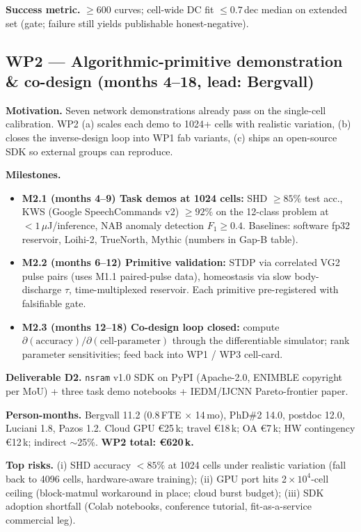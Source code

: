 \textbf{Success metric.} $\geq 600$ curves; cell-wide DC fit $\leq 0.7$\,dec
median on extended set (gate; failure still yields publishable
honest-negative).

\subsection{WP2 --- Algorithmic-primitive demonstration \& co-design
(months 4--18, lead: Bergvall)}

\textbf{Motivation.} Seven network demonstrations already pass on the
single-cell calibration. WP2 (a) scales each demo to 1024+ cells with
realistic variation, (b) closes the inverse-design loop into WP1 fab
variants, (c) ships an open-source SDK so external groups can reproduce.

\textbf{Milestones.}
\begin{itemize}[leftmargin=1.4em, topsep=2pt, itemsep=1pt]
\item \textbf{M2.1 (months 4--9) Task demos at 1024 cells:} SHD
$\geq\!85\%$ test acc., KWS (Google SpeechCommands v2)
$\geq\!92\%$ on the 12-class problem at $<\!1\,\mu$J/inference,
NAB anomaly detection $F_1\!\geq\!0.4$. Baselines: software fp32
reservoir, Loihi-2, TrueNorth, Mythic (numbers in Gap-B table).
\item \textbf{M2.2 (months 6--12) Primitive validation:} STDP via
correlated VG2 pulse pairs (uses M1.1 paired-pulse data), homeostasis
via slow body-discharge $\tau$, time-multiplexed reservoir. Each
primitive pre-registered with falsifiable gate.
\item \textbf{M2.3 (months 12--18) Co-design loop closed:} compute
$\partial(\text{accuracy})/\partial(\text{cell-parameter})$ through the
differentiable simulator; rank parameter sensitivities; feed back into
WP1 / WP3 cell-card.
\end{itemize}

\textbf{Deliverable D2.} \texttt{nsram} v1.0 SDK on PyPI
(Apache-2.0, ENIMBLE copyright per MoU) + three task demo notebooks +
IEDM/IJCNN Pareto-frontier paper.

\textbf{Person-months.} Bergvall 11.2 (0.8\,FTE $\times$ 14\,mo),
PhD\#2 14.0, postdoc 12.0, Luciani 1.8, Pazos 1.2. Cloud GPU
\euro 25\,k; travel \euro 18\,k; OA \euro 7\,k; HW contingency
\euro 12\,k; indirect $\sim$25\%.  \textbf{WP2 total: \euro 620\,k.}

\textbf{Top risks.} (i) SHD accuracy $<\!85\%$ at 1024 cells under
realistic variation (fall back to 4096 cells, hardware-aware training);
(ii) GPU port hits 2\,$\times\,10^4$-cell ceiling (block-matmul
workaround in place; cloud burst budget); (iii) SDK adoption shortfall
(Colab notebooks, conference tutorial, fit-as-a-service commercial leg).

